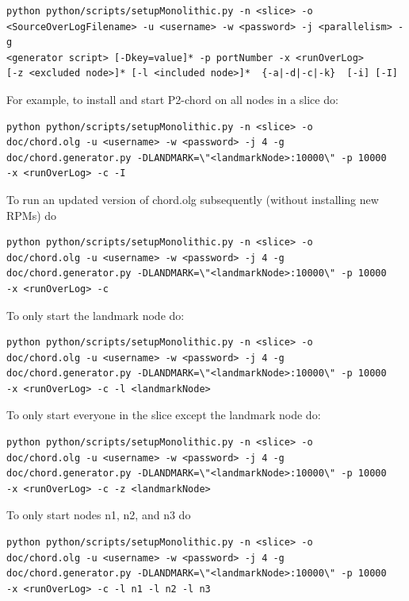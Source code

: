 \documentclass{article}
\begin{document}
\begin{itemize}
\begin{verbatim}
python python/scripts/setupMonolithic.py -n <slice> -o
<SourceOverLogFilename> -u <username> -w <password> -j <parallelism> -g
<generator script> [-Dkey=value]* -p portNumber -x <runOverLog>
[-z <excluded node>]* [-l <included node>]*  {-a|-d|-c|-k}  [-i] [-I]
\end{verbatim}

For example, to install and start P2-chord on all nodes in a slice do:

\begin{verbatim}
python python/scripts/setupMonolithic.py -n <slice> -o
doc/chord.olg -u <username> -w <password> -j 4 -g
doc/chord.generator.py -DLANDMARK=\"<landmarkNode>:10000\" -p 10000
-x <runOverLog> -c -I
\end{verbatim}

To run an updated version of chord.olg subsequently (without installing
new RPMs) do

\begin{verbatim}
python python/scripts/setupMonolithic.py -n <slice> -o
doc/chord.olg -u <username> -w <password> -j 4 -g
doc/chord.generator.py -DLANDMARK=\"<landmarkNode>:10000\" -p 10000
-x <runOverLog> -c
\end{verbatim}

To only start the landmark node do:

\begin{verbatim}
python python/scripts/setupMonolithic.py -n <slice> -o
doc/chord.olg -u <username> -w <password> -j 4 -g
doc/chord.generator.py -DLANDMARK=\"<landmarkNode>:10000\" -p 10000
-x <runOverLog> -c -l <landmarkNode>
\end{verbatim}

To only start everyone in the slice except the landmark node do:

\begin{verbatim}
python python/scripts/setupMonolithic.py -n <slice> -o
doc/chord.olg -u <username> -w <password> -j 4 -g
doc/chord.generator.py -DLANDMARK=\"<landmarkNode>:10000\" -p 10000
-x <runOverLog> -c -z <landmarkNode>
\end{verbatim}

To only start nodes n1, n2, and n3 do

\begin{verbatim}
python python/scripts/setupMonolithic.py -n <slice> -o
doc/chord.olg -u <username> -w <password> -j 4 -g
doc/chord.generator.py -DLANDMARK=\"<landmarkNode>:10000\" -p 10000
-x <runOverLog> -c -l n1 -l n2 -l n3
\end{verbatim}


\end{itemize}
\end{document}

